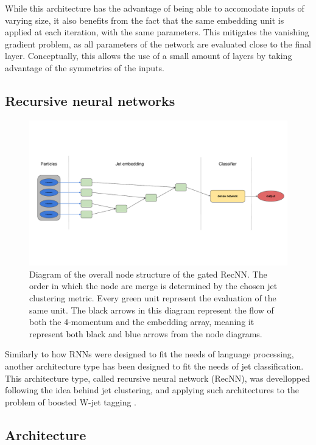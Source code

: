 While this architecture has the advantage of being able to accomodate inputs of varying size, it also benefits from the fact that the same embedding unit is applied at each iteration, with the same parameters. This mitigates the vanishing gradient problem, as all parameters of the network are evaluated close to the final layer. Conceptually, this allows the use of a small amount of layers by taking advantage of the symmetries of the inputs. 

\subsection{Recursive neural networks}
\label{sec:RecNN}


\begin{figure}
    \centering
    \includegraphics[width=\textwidth]{Images/RecNN_diagram_not_parall.pdf}
    \caption{Diagram of the overall node structure of the gated RecNN. The order in which the node are merge is determined by the chosen jet clustering metric. Every green unit represent the evaluation of the same unit. The black arrows in this diagram represent the flow of both the 4-momentum and the embedding array, meaning it represent both black and blue arrows from the node diagrams.}
    \label{fig:recursive_network}
\end{figure}


Similarly to how RNNs were designed to fit the needs of language processing, another architecture type has been designed to fit the needs of jet classification. This architecture type, called recursive neural network (RecNN), was devellopped following the idea behind jet clustering, and applying such architectures to the problem of boosted W-jet tagging \cite{Louppe:2017ipp}.

\subsection{Architecture}


